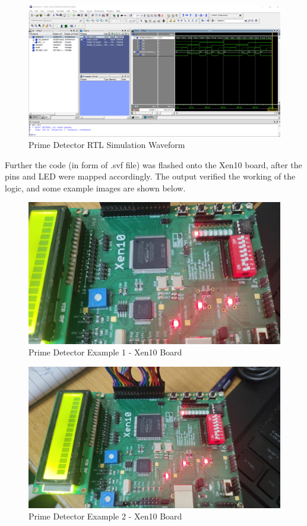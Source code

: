 \documentclass[12pt]{article}
\begin{document}
\begin{figure}[H]
\centering
  \includegraphics[scale=0.35]{Images/PrimeNumber_RTLSimulation.png}
  \caption{Prime Detector RTL Simulation Waveform}
\end{figure}

Further the code (in form of .svf file) was flashed onto the Xen10 board, after the pins and LED were mapped accordingly. The output verified the working of the logic, and some example images are shown below.

\begin{figure}[H]
\centering
  \includegraphics[scale=0.35]{Images/Trial01.jpeg}
  \caption{Prime Detector Example 1 - Xen10 Board}
\end{figure}

\begin{figure}[H]
\centering
  \includegraphics[scale=0.35]{Images/Trial02.jpeg}
  \caption{Prime Detector Example 2 - Xen10 Board}
\end{figure}
\end{document}
